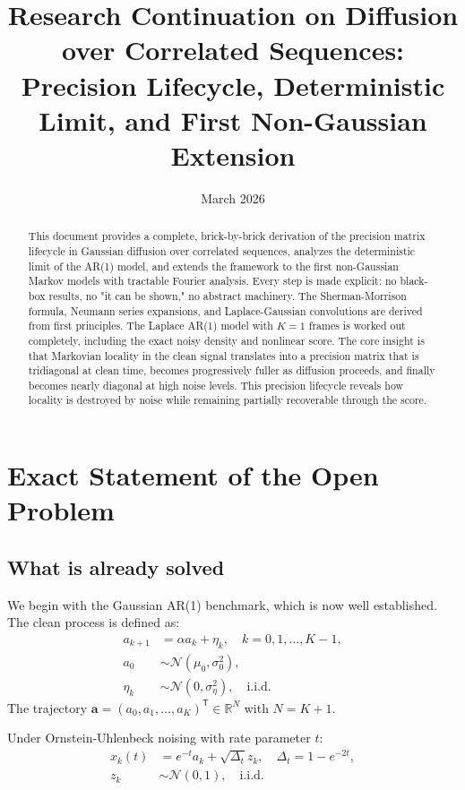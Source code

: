 \documentclass[11pt,a4paper]{article}
\title{Research Continuation on Diffusion over Correlated Sequences: \\
Precision Lifecycle, Deterministic Limit, and First Non-Gaussian Extension}
\author{}
\date{March 2026}
\theoremstyle{plain}
\theoremstyle{definition}
\newcommand{\delt}{\Delta_t}
\newcommand{\vct}[1]{\mathbf{#1}}
\newcommand{\tr}{\mathsf{T}}
\begin{document}
\maketitle

\begin{abstract}
This document provides a complete, brick-by-brick derivation of the precision matrix lifecycle in Gaussian diffusion over correlated sequences, analyzes the deterministic limit of the AR(1) model, and extends the framework to the first non-Gaussian Markov models with tractable Fourier analysis. Every step is made explicit: no black-box results, no "it can be shown," no abstract machinery. The Sherman-Morrison formula, Neumann series expansions, and Laplace-Gaussian convolutions are derived from first principles. The Laplace AR(1) model with $K=1$ frames is worked out completely, including the exact noisy density and nonlinear score. The core insight is that Markovian locality in the clean signal translates into a precision matrix that is tridiagonal at clean time, becomes progressively fuller as diffusion proceeds, and finally becomes nearly diagonal at high noise levels. This precision lifecycle reveals how locality is destroyed by noise while remaining partially recoverable through the score.
\end{abstract}

\section{Exact Statement of the Open Problem}
\label{sec:problem}

\subsection{What is already solved}
\label{sec:solved}

We begin with the Gaussian AR(1) benchmark, which is now well established. The clean process is defined as:
\begin{align}
a_{k+1} &= \alpha a_k + \eta_k, \quad k = 0, 1, \ldots, K-1, \\
a_0 &\sim \mathcal{N}(\mu_0, \sigma_0^2), \\
\eta_k &\sim \mathcal{N}(0, \sigma_\eta^2), \quad \text{i.i.d.}
\end{align}
The trajectory $\vct{a} = (a_0, a_1, \ldots, a_K)^\tr \in \mathbb{R}^N$ with $N = K+1$.

Under Ornstein-Uhlenbeck noising with rate parameter $t$:
\begin{align}
x_k(t) &= e^{-t} a_k + \sqrt{\delt} z_k, \quad \delt = 1 - e^{-2t}, \\
z_k &\sim \mathcal{N}(0,1), \quad \text{i.i.d.}
\end{align}
\end{document}
